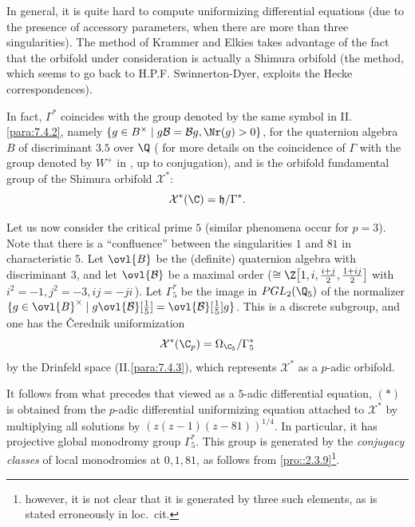 \begin{para}\label{para::4.7.6} In general, it is quite hard to compute
 uniformizing differential equations (due to the presence of
 accessory parameters, when there are
 more than three singularities). The method of Krammer and Elkies takes
 advantage of the fact that the orbifold
 under consideration is actually a Shimura orbifold (the method, which
 seems to go back to H.P.F. Swinnerton-Dyer, exploits 
 the Hecke correspondences). 

 In fact, $\Gamma^\ast$ coincides with the group denoted by the same
 symbol in  II.\ref{para:7.4.2}, namely $\{g\in B^\times \mid 
 g\mathcal{B}=\mathcal{B}g, \Nr(g)>0\}$, for the quaternion algebra $B$ of
 discriminant $3.5$ over $\Q$  \cite[IV.3.B,C]{adadq}
 (\cf \cite[8]{poaptg} for more details on the coincidence of $\Gamma$
 with the group denoted by $W^+$ in \cite{aeoaafg}, up to 
 conjugation), and is the orbifold fundamental group of the Shimura
 orbifold $\mathcal{X}^\ast$:
 \begin{equation*}
  \mathcal{X}^\ast(\C)= \mathfrak{h}/\Gamma^\ast.
 \end{equation*} 
\end{para}

\begin{para}\label{para::4.7.7} Let us now consider the critical prime
 $5$ (similar phenomena occur for $p=3$). Note that there is a 
``confluence'' between the singularities $1$ and $81$ in characteristic
 $5$. Let $\ovl{B}$ be the (definite) quaternion 
algebra with discriminant $3$, and let $\ovl{\mathcal{B}}$ be a maximal
 order ($\cong \Z\bigl[1,i,\frac{i+j}{2},\frac{1+ij}{2}\bigr]$ with 
$i^2=-1,j^2=-3,ij=-ji\,$). Let $\Gamma_5^\ast$ be the image in
 $PGL_2(\Q_5)$ of the normalizer $\{g\in \ovl{B}^\times \mid 
 g\ovl{\mathcal{B}}[\frac{1}{5}]=\ovl{\mathcal{B}}[\frac{1}{5}]g\}$. 
 This is a discrete subgroup, and one has the \v{C}erednik uniformization 
\begin{equation*}
 \mathcal{X}^\ast(\C_p)= \Omega_{\C_5}/\Gamma_5^\ast
\end{equation*} 
 by the Drinfeld space (II.\ref{para:7.4.3}), which represents
 $\mathcal{X}^\ast$ as a $p$-adic orbifold.

\medskip It follows from what precedes that viewed as a $5$-adic
 differential equation, $(\ast)$ is obtained from the $p$-adic
differential uniformizing equation attached to $\mathcal{X}^\ast$ by
multiplying all solutions by $(z(z-1)(z-81))^{1/4}$. In particular, it
has projective global monodromy group $\Gamma_5^\ast$. This group is
generated by the {\it conjugacy classes} of local monodromies at
$0,1,81$, as follows from \ref{pro::2.3.9}\footnote{however, it is not
clear that 
it is generated by three such elements, as is stated erroneously in
loc.~cit.}.
\end{para}


